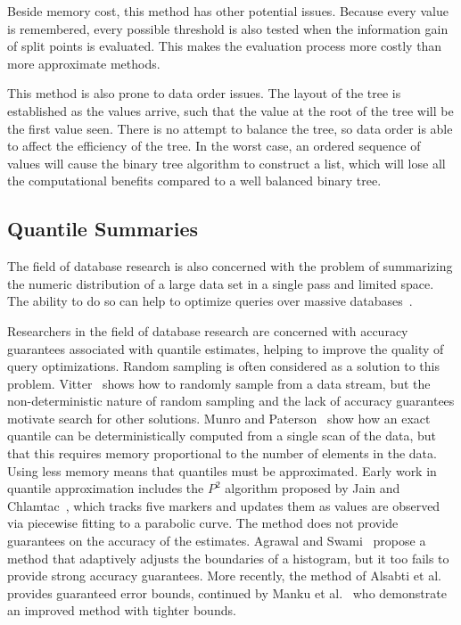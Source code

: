 Beside memory cost, this method has other potential issues. Because every value is remembered, every possible threshold is also tested when the information gain of split points is evaluated. This makes the evaluation process more costly than more approximate methods.

This method is also prone to data order issues. The layout of the tree is established as the values arrive, such that the value at the root of the tree will be the first value seen. There is no attempt to balance the tree, so data order is able to affect the efficiency of the tree. In the worst case, an ordered sequence of values will cause the binary tree algorithm to construct a list, which will lose all the computational benefits compared to a well balanced binary tree.

\subsection{Quantile Summaries}
\label{sec:quantsum}

The field of database research is also concerned with the problem of summarizing the numeric distribution of a large data set in a single pass and limited space. The ability to do so can help to optimize queries over massive databases~\cite{dboptimize}.

Researchers in the field of database research are concerned with accuracy guarantees associated with quantile estimates, helping to improve the quality of query optimizations.
Random sampling is often considered as a solution to this problem. Vitter~\cite{reservoirsample} shows how to randomly sample from a data stream, but the non-deterministic nature of random sampling and the lack of accuracy guarantees motivate search for other solutions. Munro and Paterson~\cite{exactquantile} show how an exact quantile can be deterministically computed from a single scan of the data, but that this requires memory proportional to the number of elements in the data. Using less memory means that quantiles must be approximated. Early work in quantile approximation includes the $P^{2}$ algorithm proposed by Jain and Chlamtac~\cite{p2quantile}, which tracks five markers and updates them as values are observed via piecewise fitting to a parabolic curve. The method does not provide guarantees on the accuracy of the estimates.  Agrawal and Swami~\cite{as_dbquant} propose a method that adaptively adjusts the boundaries of a histogram, but it too fails to provide strong accuracy guarantees. More recently, the method of Alsabti et al.~\cite{ars_dbquant} provides guaranteed error bounds, continued by Manku et al.~\cite{mrl_dbquant} who demonstrate an improved method with tighter bounds.

